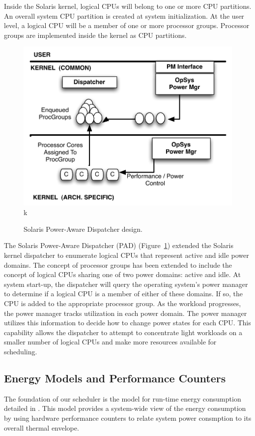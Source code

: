 \documentclass[times,12pt,onecolumn]{article}
\begin{document}
Inside the Solaris kernel, logical CPUs will belong to one or more CPU
partitions.  An overall system CPU partition is created at system
initialization.  At the user level, a logical CPU will be a member of
one or more processor groups.  Processor groups are implemented inside
the kernel as CPU partitions.
\begin{figure}
  \centering
  \includegraphics[scale=0.40]{padarch.pdf}k
  \caption{Solaris Power-Aware Dispatcher design.}
  \label{fig:padarch}
\end{figure}
The Solaris Power-Aware Dispatcher (PAD) (Figure~\ref{fig:padarch})
\cite{Sun2009} extended the Solaris kernel dispatcher to enumerate
logical CPUs that represent active and idle power domains.  The concept
of processor groups has been extended to include the concept of logical
CPUs sharing one of two power domains: active and idle.  At system
start-up, the dispatcher will query the operating system's power manager
to determine if a logical CPU is a member of either of these domains.
If so, the CPU is added to the appropriate processor group.  As the
workload progresses, the power manager tracks utilization in each power
domain.  The power manager utilizes this information to decide how to
change power states for each CPU.  This capability allows the dispatcher
to attempt to concentrate light workloads on a smaller number of logical
CPUs and make more resources available for scheduling.

\subsection{Energy Models and Performance Counters}
\label{sec:energymodels}
The foundation of our scheduler is the model for run-time energy
consumption detailed in \cite{Lewis2008}. This model provides a
system-wide view of the energy consumption by using hardware performance
counters to relate system power consmption to its overall thermal
envelope.
\end{document}
